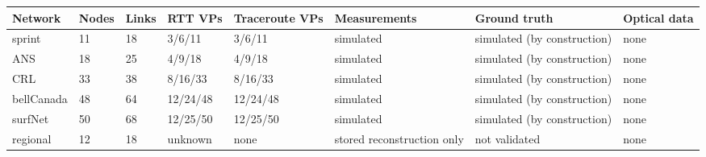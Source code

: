 \begin{tabular}{llllllll}
\toprule
Network & Nodes & Links & RTT VPs & Traceroute VPs & Measurements & Ground truth & Optical data \\
\midrule
sprint & 11 & 18 & 3/6/11 & 3/6/11 & simulated & simulated (by construction) & none \\
ANS & 18 & 25 & 4/9/18 & 4/9/18 & simulated & simulated (by construction) & none \\
CRL & 33 & 38 & 8/16/33 & 8/16/33 & simulated & simulated (by construction) & none \\
bellCanada & 48 & 64 & 12/24/48 & 12/24/48 & simulated & simulated (by construction) & none \\
surfNet & 50 & 68 & 12/25/50 & 12/25/50 & simulated & simulated (by construction) & none \\
regional & 12 & 18 & unknown & none & stored reconstruction only & not validated & none \\
\bottomrule
\end{tabular}
